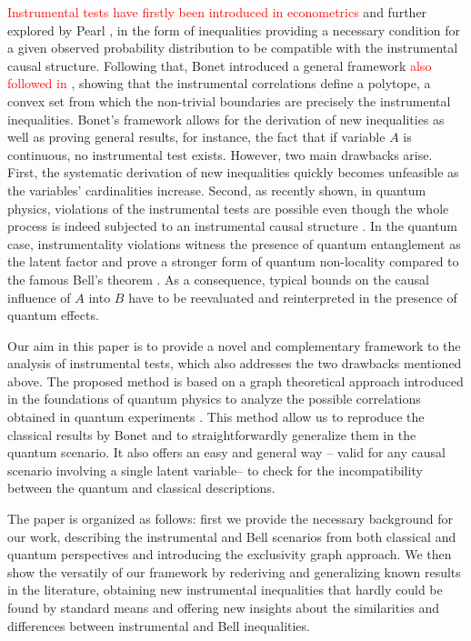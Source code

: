 \documentclass[letterpaper]{article}
\begin{document}
\textcolor{red}{Instrumental tests have firstly been introduced in econometrics \cite{Wooldridge2015}} and further explored by Pearl \cite{pearl1995}, in the form of inequalities providing a necessary condition for a given observed
probability distribution to be compatible with the instrumental causal
structure. Following that, Bonet \cite{bonet2001} introduced a general
framework \textcolor{red}{also followed in \cite{Ramsahai2012}}, showing that the instrumental correlations define a polytope, a
convex set from which the non-trivial boundaries are precisely the instrumental
inequalities. Bonet's framework allows for the derivation of new inequalities
as well as proving general results, for instance, the fact that if variable $A$
is continuous, no instrumental test exists. However, two main drawbacks arise. First, the systematic derivation of new inequalities quickly becomes
unfeasible as the variables' cardinalities increase. Second, as recently shown,
in quantum physics, violations of the instrumental tests are possible even
though the whole process is indeed subjected to an instrumental causal structure
\cite{chaves2018, himbeeck2018}. In the quantum case, instrumentality violations
witness the presence of quantum entanglement as the latent factor and prove a
stronger form of quantum non-locality compared to the famous Bell's theorem
\cite{chaves2018}. As a consequence, typical bounds on the causal influence of
$A$ into $B$ have to be reevaluated and reinterpreted in the presence of quantum
effects.

Our aim in this paper is to provide a novel and complementary framework to the
analysis of instrumental tests, which also addresses the two drawbacks mentioned
above. The proposed method is based on a graph theoretical approach introduced
in the foundations of quantum physics to analyze the possible correlations
obtained in quantum experiments \cite{cabello2014,rabelo2014}. This method allow us to reproduce the classical results by Bonet and to straightforwardly generalize them in the quantum scenario. It also offers an easy and general way -- valid for any causal scenario involving a single latent variable-- to check for the incompatibility between the
quantum and classical descriptions.

The paper is organized as follows: first we provide the necessary background for our work, describing the instrumental and Bell scenarios from both classical and quantum perspectives and introducing the exclusivity graph approach. We then show the versatily of our framework by rederiving and generalizing known results in the literature, obtaining new instrumental inequalities that hardly could be found by standard means and offering new insights about the similarities and differences between instrumental and Bell inequalities.
\end{document}
